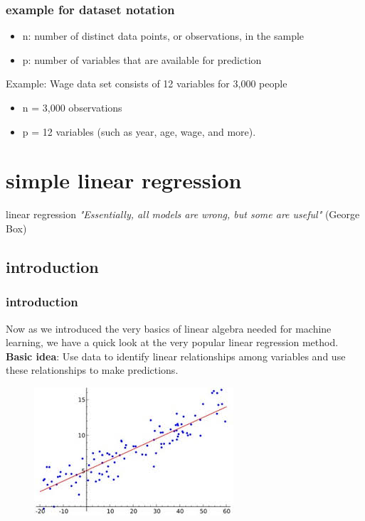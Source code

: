 \documentclass{beamer}
\begin{document}
\begin{frame}
\frametitle{example for dataset notation}
\begin{itemize}
\item n: number of distinct data points, or observations, in the sample
\item p: number of variables that are available for prediction
\end{itemize}
\bigskip
Example: Wage data set consists of 12 variables for 3,000 people
\begin{itemize}
\item n = 3,000 observations
\item p = 12 variables (such as year, age, wage, and more).
\end{itemize}

\end{frame}





\section{simple linear regression}
\begin{frame}
\Huge{linear regression}
\newline
\newline
\normalsize
\textit{ "Essentially, all models are wrong, but some are useful" } (George Box)
\end{frame}

\subsection{introduction}
\begin{frame}
\frametitle{introduction}
Now as we introduced the very basics of linear algebra needed for machine learning, we have a quick look at the very popular linear regression method.
\newline
\textbf{Basic idea}:
\newline
Use data to identify linear relationships among variables and use these relationships to make predictions.
\begin{figure}
\includegraphics[width=0.45\linewidth]{figures/03/linear_regression.jpg}
\end{figure}
\end{frame}
\end{document}
